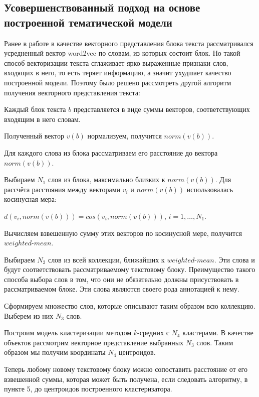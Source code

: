 \documentclass[12pt]{article}
\begin{document}
\subsection{Усовершенствованный подход на основе построенной тематической модели}
Ранее в работе в качестве векторного представления блока текста рассматривался усредненный вектор word2vec по словам, из которых состоит блок. Но такой способ векторизации текста сглаживает ярко выраженные признаки слов, входящих в него, то есть теряет информацию, а значит ухудшает качество построенной модели. Поэтому было решено рассмотреть другой алгоритм получения векторного представления текста:
\par\begin{enumerate}{
		\vspace{-0.2cm}\item Каждый блок текста	$b$ представляется в виде суммы векторов, соответствующих входящим в него словам.
		\vspace{-0.2cm}\item Полученный вектор $v(b)$ нормализуем, получится $norm(v(b))$.
		\vspace{-0.2cm}\item Для каждого слова из блока рассматриваем его расстояние до вектора $norm(v(b))$.
		\vspace{-0.2cm}\item Выбираем $N_1$ слов из блока, максимально близких к $norm(v(b))$. Для рассчёта расстояния между векторами $v_i$ и $norm(v(b))$ использовалась косинусная мера: 
		
		$d(v_i,norm(v(b))) = cos(v_i,norm(v(b)))$,\hspace{0.5cm} $i = 1, \ldots, N_1.$
		
		\vspace{-0.2cm}\item Вычисляем взвешенную сумму этих векторов по косинусной мере, получится $weighted$-$mean$.
		\vspace{-0.2cm}\item Выбираем $N_2$ слов из всей коллекции, ближайших к $weighted$-$mean$. Эти слова и будут соответствовать рассматриваемому текстовому блоку.  Преимущество такого способа выбора слов в том, что они не обязательно должны присуствовать в рассматриваемом блоке. Эти слова являются своего рода аннотацией к нему.
		\vspace{-0.2cm}\item Сформируем множество слов, которые описывают таким образом всю коллекцию. Выберем из них $N_3$ слов.
		\vspace{-0.2cm}\item Построим модель кластеризации методом $k$-средних с $N_4$ кластерами. В качестве объектов рассмотрим векторное представление выбранных $N_3$ слов. Таким образом мы получим координаты $N_4$ центроидов.
		\vspace{-0.2cm}\item Теперь любому новому текстовому блоку можно сопоставить расстояние от его взвешенной суммы, которая может быть получена, если следовать алгоритму, в пункте 5, до центроидов построенного кластеризатора. 
}\end{enumerate}
\end{document}

